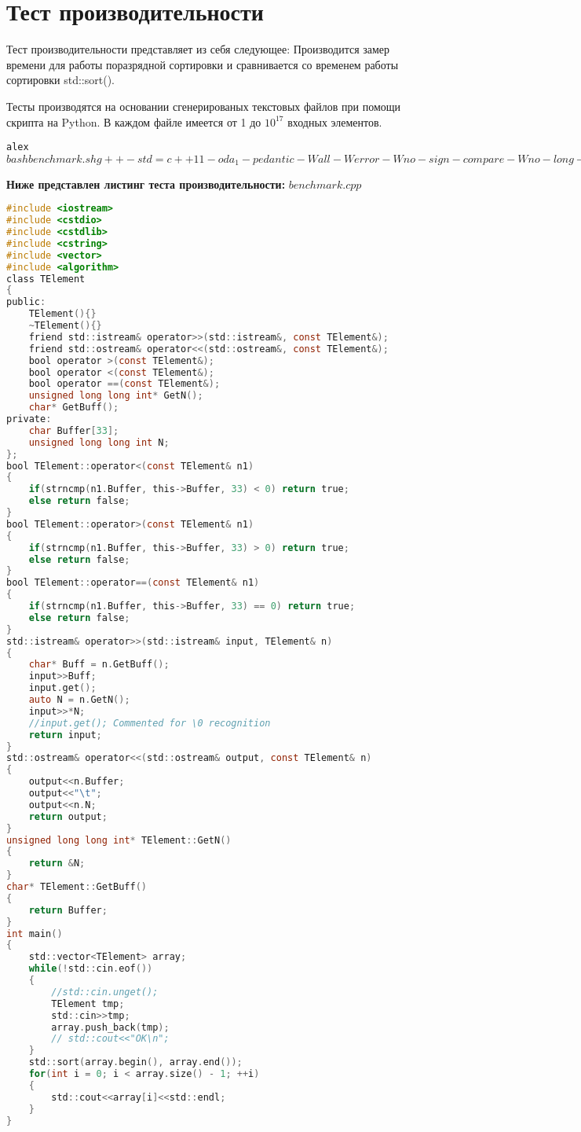 \section{Тест производительности}

Тест производительности представляет из себя следующее: Производится замер времени для работы поразрядной сортировки и сравнивается со временем работы сортировки std::sort().

Тесты производятся на основании сгенерированых текстовых файлов при помощи скрипта на Python. В каждом файле имеется от 1 до $10^{17}$ входных элементов.

\begin{alltt}
alex$ bash benchmark.sh 
g++ -std=c++11 -o da_1 -pedantic -Wall -Werror -Wno-sign-compare -Wno-long-long -lm main.cpp sort.cpp 
Time for Radix Sort

real	0m20.225s
user	0m19.748s
sys		0m0.472s
Time for std::sort()

real	0m28.851s
user	0m27.836s
sys		0m1.000s
alex$
\end{alltt}
\textbf{Ниже представлен листинг теста производительности:}
$benchmark.cpp$
\begin{lstlisting}[language=C]
#include <iostream>
#include <cstdio>
#include <cstdlib>
#include <cstring>
#include <vector>
#include <algorithm>
class TElement
{
public:
    TElement(){}
    ~TElement(){}
    friend std::istream& operator>>(std::istream&, const TElement&);
    friend std::ostream& operator<<(std::ostream&, const TElement&);
    bool operator >(const TElement&);
    bool operator <(const TElement&);
    bool operator ==(const TElement&);
    unsigned long long int* GetN();
    char* GetBuff();
private:
    char Buffer[33];
    unsigned long long int N;
};
bool TElement::operator<(const TElement& n1)
{
    if(strncmp(n1.Buffer, this->Buffer, 33) < 0) return true;
    else return false;
}
bool TElement::operator>(const TElement& n1)
{
    if(strncmp(n1.Buffer, this->Buffer, 33) > 0) return true;
    else return false;
}
bool TElement::operator==(const TElement& n1)
{
    if(strncmp(n1.Buffer, this->Buffer, 33) == 0) return true;
    else return false;
}
std::istream& operator>>(std::istream& input, TElement& n)
{
    char* Buff = n.GetBuff();
    input>>Buff;
    input.get();
    auto N = n.GetN();
    input>>*N;
    //input.get(); Commented for \0 recognition
    return input;
}
std::ostream& operator<<(std::ostream& output, const TElement& n)
{
    output<<n.Buffer;
    output<<"\t";
    output<<n.N;
    return output;
}
unsigned long long int* TElement::GetN()
{
    return &N;
}
char* TElement::GetBuff()
{
    return Buffer;
}
int main()
{
    std::vector<TElement> array;
    while(!std::cin.eof())
    {
        //std::cin.unget();
        TElement tmp;
        std::cin>>tmp;
        array.push_back(tmp);
        // std::cout<<"OK\n";
    }
    std::sort(array.begin(), array.end());
    for(int i = 0; i < array.size() - 1; ++i)
    {
        std::cout<<array[i]<<std::endl;
    }
}
\end{lstlisting}

